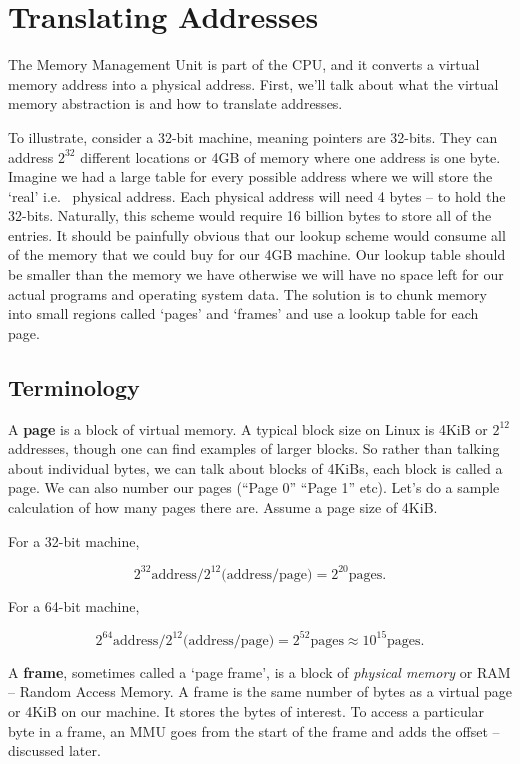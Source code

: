 \section{Translating Addresses}
	 
The Memory Management Unit is part of the CPU, and it converts a virtual memory address into a physical address.
First, we'll talk about what the virtual memory abstraction is and how to translate addresses.
	 
To illustrate, consider a 32-bit machine, meaning pointers are 32-bits.
They can address $2^{32}$ different locations or 4GB of memory where one address is one byte.
Imagine we had a large table for every possible address where we will store the `real' i.e. ~physical address.
Each physical address will need 4 bytes -- to hold the 32-bits.
Naturally, this scheme would require 16 billion bytes to store all of the entries.
It should be painfully obvious that our lookup scheme would consume all of the memory that we could buy for our 4GB machine.
Our lookup table should be smaller than the memory we have otherwise we will have no space left for our actual programs and operating system data.
The solution is to chunk memory into small regions called `pages' and `frames' and use a lookup table for each page.
	 
\subsection{Terminology}
	 
A \textbf{page} is a block of virtual memory.
A typical block size on Linux is 4KiB or $2^{12}$ addresses, though one can find examples of larger blocks.
So rather than talking about individual bytes, we can talk about blocks of 4KiBs, each block is called a page.
We can also number our pages (``Page 0'' ``Page 1'' etc). Let's do a sample calculation of how many pages there are. Assume a page size of 4KiB.
	 
For a 32-bit machine,
	 
\[
	2^{32} \text{address} / 2^{12} \text{(address/page)} = 2^{20} \text{pages}.
\]
	 
For a 64-bit machine,
	 
\[
	2^{64} \text{address} / 2^{12} \text{(address/page)} = 2^{52} \text{pages} \approx 10^{15} \text{pages}.
\]
	 
A \textbf{frame}, sometimes called a `page frame', is a block of \emph{physical memory} or RAM -- Random Access Memory.
A frame is the same number of bytes as a virtual page or 4KiB on our machine.
It stores the bytes of interest.
To access a particular byte in a frame, an MMU goes from the start of the frame and adds the offset -- discussed later.
	 
